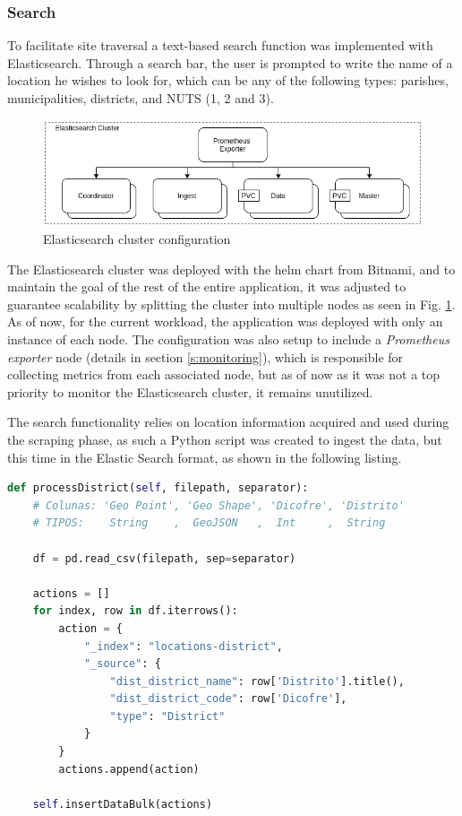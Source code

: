\subsubsection{Search}

To facilitate site traversal a text-based search function was implemented with Elasticsearch. Through a search bar, the user is prompted to write the name of a location he wishes to look for, which can be any of the following types: parishes, municipalities, districts, and NUTS (1, 2 and 3). 

\begin{figure}[h]
    \centering
    \includegraphics[width=1\textwidth]{Chapters/img/backend/es-architecture-sem-kibana.png}
    \caption{Elasticsearch cluster configuration} 
    \label{fig:es-architecture}
\end{figure}

The Elasticsearch cluster was deployed with the helm chart from Bitnami, and to maintain the goal of the rest of the entire application, it was adjusted to guarantee scalability by splitting the cluster into multiple nodes as seen in Fig. \ref{fig:es-architecture}. As of now, for the current workload, the application was deployed with only an instance of each node. The configuration was also setup to include a \textit{Prometheus exporter} node (details in section \ref{s:monitoring}), which is responsible for collecting metrics from each associated node, but as of now as it was not a top priority to monitor the Elasticsearch cluster, it remains unutilized.

The search functionality relies on location information acquired and used during the scraping phase, as such a Python script was created to ingest the data, but this time in the Elastic Search format, as shown in the following listing. 

\begin{lstlisting}[float, language=Python, caption={[Python data ingestion into Elastic Search]{Snippet of one the implementations done to insert data into the elastic search cluster with Python}}, captionpos=t]
def processDistrict(self, filepath, separator):
    # Colunas: 'Geo Point', 'Geo Shape', 'Dicofre', 'Distrito'
    # TIPOS:    String    ,  GeoJSON   ,  Int     ,  String

    df = pd.read_csv(filepath, sep=separator)

    actions = []
    for index, row in df.iterrows():
        action = {
            "_index": "locations-district",
            "_source": {
                "dist_district_name": row['Distrito'].title(),
                "dist_district_code": row['Dicofre'],
                "type": "District"
            }
        }
        actions.append(action)

    self.insertDataBulk(actions)
\end{lstlisting}

